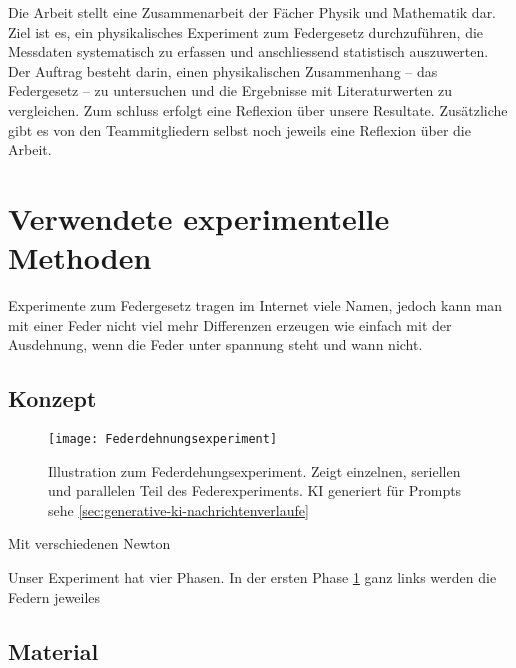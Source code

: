 \documentclass[../main.tex]{subfiles} %
\begin{document}
        Die Arbeit stellt eine Zusammenarbeit der Fächer Physik und Mathematik dar.
        Ziel ist es, ein physikalisches Experiment zum Federgesetz durchzuführen, die Messdaten systematisch zu erfassen und anschliessend statistisch auszuwerten.
        Der Auftrag besteht darin, einen physikalischen Zusammenhang – das Federgesetz – zu untersuchen und die Ergebnisse mit Literaturwerten zu vergleichen.
        Zum schluss erfolgt eine Reflexion über unsere Resultate.
        Zusätzliche gibt es von den Teammitgliedern selbst noch jeweils eine Reflexion über die Arbeit.


    \section{Verwendete experimentelle Methoden}\label{sec:verwendete-experimentelle-methoden}

        Experimente zum Federgesetz tragen im Internet viele Namen, jedoch kann man mit einer Feder nicht viel mehr Differenzen
        erzeugen wie einfach mit der Ausdehnung, wenn die Feder unter spannung steht und wann nicht.

        \subsection{Konzept}\label{subsec:konzept}

            \begin{figure}[h]
                \centering
                \texttt{[image: Federdehnungsexperiment]}
                \caption{Illustration zum Federdehungsexperiment. Zeigt einzelnen, seriellen und parallelen Teil des Federexperiments. KI generiert für Prompts sehe \ref{sec:generative-ki-nachrichtenverlaufe}}
                \label{fig:mesh1}
            \end{figure}

            Mit verschiedenen Newton

            Unser Experiment hat vier Phasen.
            In der ersten Phase \ref{fig:mesh1} ganz links werden die Federn jeweiles

        \subsection{Material}\label{subsec:material}
\end{document}
